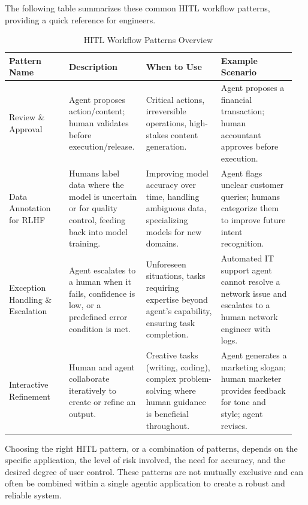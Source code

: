The following table summarizes these common HITL workflow patterns, providing a quick reference for engineers.
\begin{table}[h!]
\centering
\caption{HITL Workflow Patterns Overview}
\label{tab:hitl_patterns}
\begin{tabular}{|p{0.2\linewidth}|p{0.25\linewidth}|p{0.25\linewidth}|p{0.25\linewidth}|}
\hline
\textbf{Pattern Name} & \textbf{Description} & \textbf{When to Use} & \textbf{Example Scenario} \\
\hline
Review \& Approval & Agent proposes action/content; human validates before execution/release. & Critical actions, irreversible operations, 
high-stakes content generation. & Agent proposes a financial transaction; human accountant approves before execution. \\
\hline
Data Annotation for RLHF & Humans label data where the model is uncertain or for quality control, feeding back into model training. & Improving model
 accuracy over time, handling ambiguous data, specializing models for new domains. & Agent flags unclear customer queries; humans categorize them
  to improve future intent recognition. \\
\hline
Exception Handling \& Escalation & Agent escalates to a human when it fails, confidence is low, or a predefined error condition is met. & Unforeseen situations, 
tasks requiring expertise beyond agent's capability, ensuring task completion. & Automated IT support agent cannot resolve a network issue 
and escalates to a human network engineer with logs. \\
\hline
Interactive Refinement & Human and agent collaborate iteratively to create or refine an output. & Creative tasks (writing, coding), 
complex problem-solving where human guidance is beneficial throughout. & Agent generates a marketing slogan; human marketer provides 
feedback for tone and style; agent revises. \\
\hline
\end{tabular}
\end{table}

Choosing the right HITL pattern, or a combination of patterns, depends on the specific application, the level of risk involved, 
the need for accuracy, and the desired degree of user control. These patterns are not mutually exclusive and can often be combined 
within a single agentic application to create a robust and reliable system.

